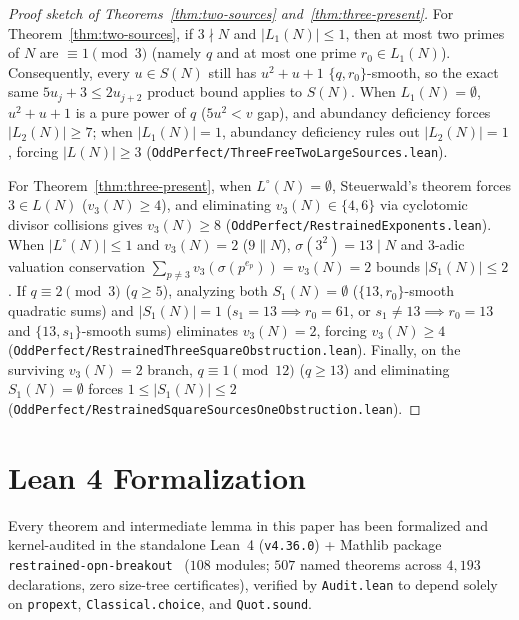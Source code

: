 \documentclass[11pt]{amsart}
\theoremstyle{definition}
\theoremstyle{remark}
\begin{document}
\begin{proof}[Proof sketch of Theorems~\ref{thm:two-sources} and~\ref{thm:three-present}]
For Theorem~\ref{thm:two-sources}, if $3 \nmid N$ and $|L_1(N)| \le 1$, then at most two primes of $N$ are $\equiv 1 \pmod 3$ (namely $q$ and at most one prime $r_0 \in L_1(N)$). Consequently, every $u \in S(N)$ still has $u^2 + u + 1$ $\{q, r_0\}$-smooth, so the exact same $5 u_j + 3 \le 2 u_{j+2}$ product bound applies to $S(N)$. When $L_1(N) = \emptyset$, $u^2 + u + 1$ is a pure power of $q$ ($5 u^2 < v$ gap), and abundancy deficiency forces $|L_2(N)| \ge 7$; when $|L_1(N)| = 1$, abundancy deficiency rules out $|L_2(N)| = 1$, forcing $|L(N)| \ge 3$ (\texttt{OddPerfect/ThreeFreeTwoLargeSources.lean}).

For Theorem~\ref{thm:three-present}, when $L^\circ(N) = \emptyset$, Steuerwald's theorem forces $3 \in L(N)$ ($v_3(N) \ge 4$), and eliminating $v_3(N) \in \{4, 6\}$ via cyclotomic divisor collisions gives $v_3(N) \ge 8$ (\texttt{OddPerfect/RestrainedExponents.lean}). When $|L^\circ(N)| \le 1$ and $v_3(N) = 2$ ($9 \parallel N$), $\sigma(3^2) = 13 \mid N$ and $3$-adic valuation conservation $\sum_{p \ne 3} v_3(\sigma(p^{e_p})) = v_3(N) = 2$ bounds $|S_1(N)| \le 2$. If $q \equiv 2 \pmod 3$ ($q \ge 5$), analyzing both $S_1(N) = \emptyset$ ($\{13, r_0\}$-smooth quadratic sums) and $|S_1(N)| = 1$ ($s_1 = 13 \implies r_0 = 61$, or $s_1 \ne 13 \implies r_0 = 13$ and $\{13, s_1\}$-smooth sums) eliminates $v_3(N) = 2$, forcing $v_3(N) \ge 4$ (\texttt{OddPerfect/RestrainedThreeSquareObstruction.lean}). Finally, on the surviving $v_3(N) = 2$ branch, $q \equiv 1 \pmod{12}$ ($q \ge 13$) and eliminating $S_1(N) = \emptyset$ forces $1 \le |S_1(N)| \le 2$ (\texttt{OddPerfect/RestrainedSquareSourcesOneObstruction.lean}).
\end{proof}

\section{Lean 4 Formalization}

Every theorem and intermediate lemma in this paper has been formalized and kernel-audited in the standalone Lean~4 (\texttt{v4.36.0}) + Mathlib package \texttt{restrained-opn-breakout}~\cite{HamiltonRestrained} ($108$ modules; $507$ named theorems across $4{,}193$ declarations, zero size-tree certificates), verified by \texttt{Audit.lean} to depend solely on \texttt{propext}, \texttt{Classical.choice}, and \texttt{Quot.sound}.
\end{document}
